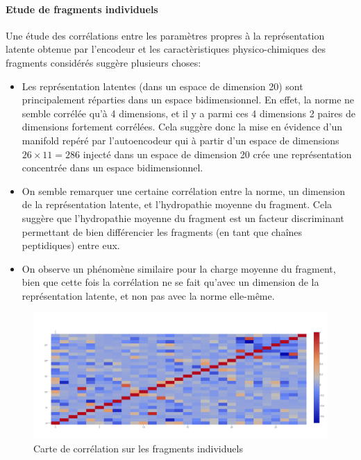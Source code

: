 \documentclass[a4paper, 11pt, onecolumn]{article}
\begin{document}
\paragraph{Etude de fragments individuels}

Une étude des corrélations entre les paramètres propres à la représentation
latente obtenue par l'encodeur et les caractèristiques physico-chimiques des
fragments considérés suggère plusieurs choses:
\begin{itemize}
\item Les représentation latentes (dans un espace de dimension 20) sont
  principalement réparties dans un espace bidimensionnel. En effet, la norme ne
  semble corrélée qu'à 4 dimensions, et il y a parmi ces 4 dimensions 2 paires
  de dimensions fortement corrélées. Cela suggère donc la mise en évidence d'un
  manifold repéré par l'autoencodeur qui à partir d'un espace de dimensions
  $26\times 11= 286$ injecté dans un espace de dimension 20 crée une
  représentation concentrée dans un espace bidimensionnel.
  
\item On semble remarquer une certaine corrélation entre la norme, un dimension
  de la représentation latente, et l'hydropathie moyenne du fragment. Cela
  suggère que l'hydropathie moyenne du fragment est un facteur discriminant
  permettant de bien différencier les fragments (en tant que chaînes
  peptidiques) entre eux.
\item On observe un phénomène similaire pour la charge moyenne du fragment, bien
  que cette fois la corrélation ne se fait qu'avec un dimension de la
  représentation latente, et non pas avec la norme elle-même.
\end{itemize}

\begin{figure}
  \centering
  \includegraphics[scale=0.3]{SingleOneRecHeat}
  \caption{Carte de corrélation sur les fragments individuels}
\end{figure}
\end{document}
